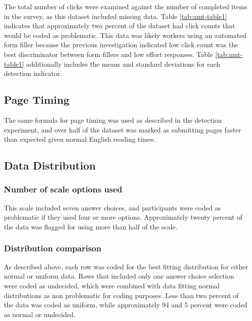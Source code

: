 \documentclass[english,man]{apa6}
\theoremstyle{definition}
\theoremstyle{definition}
\theoremstyle{definition}
\theoremstyle{remark}
\begin{document}
The total number of clicks were examined against the number of completed
items in the survey, as this dataset included missing data. Table
\ref{tab:amt-table1} indicates that approximately two percent of the
dataset had click counts that would be coded as problematic. This data
was likely workers using an automated form filler because the previous
investigation indicated low click count was the best discriminator
between form fillers and low effort responses. Table
\ref{tab:amt-table1} additionally includes the means and standard
deviations for each detection indicator.

\subsection{Page Timing}\label{page-timing-2}

The same formula for page timing was used as described in the detection
experiment, and over half of the dataset was marked as submitting pages
faster than expected given normal English reading times.

\subsection{Data Distribution}\label{data-distribution-2}

\subsubsection{Number of scale options
used}\label{number-of-scale-options-used}

This scale included seven answer choices, and participants were coded as
problematic if they used four or more options. Approximately twenty
percent of the data was flagged for using more than half of the scale.

\subsubsection{Distribution comparison}\label{distribution-comparison-1}

As described above, each row was coded for the best fitting distribution
for either normal or uniform data. Rows that included only one answer
choice selection were coded as undecided, which were combined with data
fitting normal distributions as non problematic for coding purposes.
Less than two percent of the data was coded as uniform, while
approximately 94 and 5 percent were coded as normal or undecided.
\end{document}
